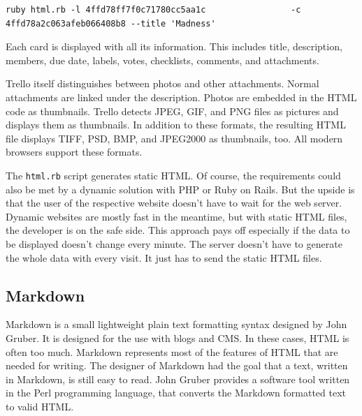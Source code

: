 \begin{lstlisting}[aboveskip=1\baselineskip, style=bash, caption=Example of a \texttt{html.rb} call., label=listing005]
ruby html.rb -l 4ffd78ff7f0c71780cc5aa1c                 -c 4ffd78a2c063afeb066408b8 --title 'Madness'
\end{lstlisting} 

Each card is displayed with all its information. This includes title, description, members, due date, labels, votes, checklists, comments, and attachments.

Trello itself distinguishes between photos and other attachments. Normal attachments are linked under the description. Photos are embedded in the HTML code as thumbnails. Trello detects JPEG, GIF, and PNG files as pictures and displays them as thumbnails. In addition to these formats, the resulting HTML file displays TIFF, PSD, BMP, and JPEG2000 as thumbnails, too. All modern browsers support these formats.

The \texttt{html.rb} script generates static HTML. Of course, the requirements could also be met by a dynamic solution with PHP or Ruby on Rails. But the upside is that the user of the respective website doesn't have to wait for the web server. Dynamic websites are mostly fast in the meantime, but with static HTML files, the developer is on the safe side. This approach pays off especially if the data to be displayed doesn't change every minute. The server doesn't have to generate the whole data with every visit. It just has to send the static HTML files.

\subsection{Markdown}
Markdown is a small lightweight plain text formatting syntax designed by John Gruber. It is designed for the use with blogs and CMS. In these cases, HTML is often too much. Markdown represents most of the features of HTML that are needed for writing. The designer of Markdown had the goal that a text, written in Markdown, is still easy to read. John Gruber provides a software tool written in the Perl programming language, that converts the Markdown formatted text to valid HTML. \cite{markdown}

